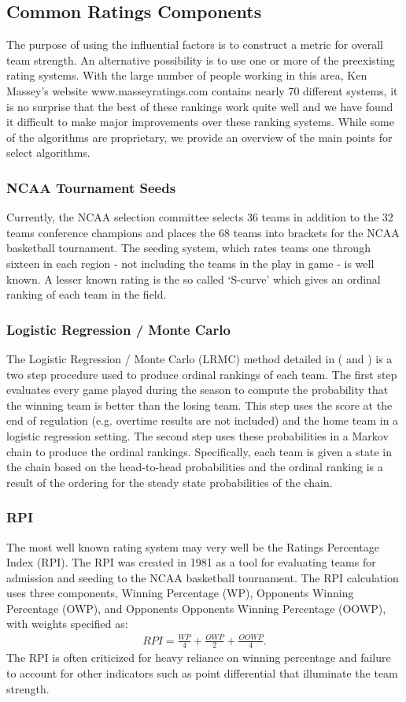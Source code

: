 \subsection{Common Ratings Components} The purpose of using the influential factors is to construct a metric for overall team strength. An alternative possibility is to use one or more of the preexisting rating systems. With the large number of people working in this area, Ken Massey's website www.masseyratings.com contains nearly 70 different systems, it is no surprise that the best of these rankings work quite well and we have found it difficult to make major improvements over these ranking systems. While some of the algorithms are proprietary, we provide an overview of the main points for select algorithms.\subsubsection{NCAA Tournament Seeds}
Currently, the NCAA selection committee selects 36 teams in addition to the 32 teams conference champions and places the 68 teams into brackets for the NCAA basketball tournament. The seeding system, which rates teams one through sixteen in each region - not including the teams in the play in game - is well known. A lesser known rating is the so called `S-curve' which gives an ordinal ranking of each team in the field.  
\subsubsection{Logistic Regression / Monte Carlo}
The Logistic Regression / Monte Carlo (LRMC) method detailed in (\cite{Kvam2006} and \cite{mark2010}) is a two step procedure used to produce ordinal rankings of each team. The first step evaluates every game played during the season to compute the probability that the winning team is better than the losing team. This step uses the score at the end of regulation (e.g. overtime results are not included) and the home team in a logistic regression setting. The second step uses these probabilities in a Markov chain to produce the ordinal rankings. Specifically, each team is given a state in the chain based on the head-to-head probabilities and the ordinal ranking is a result of the ordering for the steady state probabilities of the chain.

\subsubsection{RPI}
The most well known rating system may very well be the Ratings Percentage Index (RPI). The RPI was created in 1981 as a tool for evaluating teams for admission and seeding to the NCAA basketball tournament. The RPI calculation uses three components, Winning Percentage (WP), Opponents Winning Percentage (OWP), and Opponents Opponents Winning Percentage (OOWP), with weights specified as:
\begin{eqnarray*}
RPI = \frac{WP}{4} + \frac{OWP}{2} + \frac{OOWP}{4}.
\end{eqnarray*}
The RPI is often criticized for heavy reliance on winning percentage and failure to account for other indicators such as point differential that illuminate the team strength.

